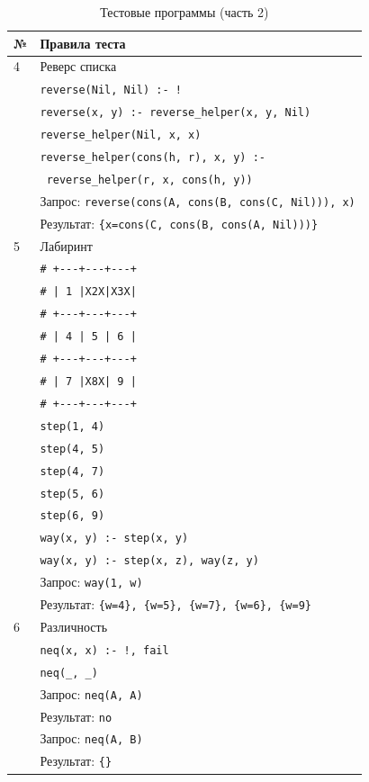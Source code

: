 \begin{table}[ht]
  \caption{Тестовые программы (часть 2)}
  \label{tbl:tests-2}
  \centering
  \begin{tabular}{|l|l|}
    \hline
    \textbf{№} & \textbf{Правила теста} \\
    \hline
    \hline
    4 & Реверс списка \\
    \hline
    & \texttt{reverse(Nil, Nil) :- !} \\
    & \texttt{reverse(x, y) :- reverse\_helper(x, y, Nil)} \\
    & \texttt{reverse\_helper(Nil, x, x)} \\
    & \texttt{reverse\_helper(cons(h, r), x, y) :-} \\
    & \texttt{    reverse\_helper(r, x, cons(h, y))} \\
    \hline
    & Запрос: \texttt{reverse(cons(A, cons(B, cons(C, Nil))), x)} \\
    & Результат: \texttt{\{x=cons(C, cons(B, cons(A, Nil)))\}} \\
    \hline
    \hline
    5 & Лабиринт \\
    \hline
    & \texttt{\# +-\--\--+-\--\--+-\--\--+} \\
    & \texttt{\# | 1 |X2X|X3X|} \\
    & \texttt{\# +-\--\--+-\--\--+-\--\--+} \\
    & \texttt{\# | 4 | 5 | 6 |} \\
    & \texttt{\# +-\--\--+-\--\--+-\--\--+} \\
    & \texttt{\# | 7 |X8X| 9 |} \\
    & \texttt{\# +-\--\--+-\--\--+-\--\--+} \\
    & \texttt{step(1, 4)} \\
    & \texttt{step(4, 5)} \\
    & \texttt{step(4, 7)} \\
    & \texttt{step(5, 6)} \\
    & \texttt{step(6, 9)} \\
    & \texttt{way(x, y) :- step(x, y)} \\
    & \texttt{way(x, y) :- step(x, z), way(z, y)} \\
    \hline
    & Запрос: \texttt{way(1, w)} \\
    & Результат: \texttt{\{w=4\}, \{w=5\}, \{w=7\}, \{w=6\}, \{w=9\}} \\
    \hline
    \hline
    6 & Различность \\
    \hline
    & \texttt{neq(x, x) :- !, fail} \\
    & \texttt{neq(\_, \_)} \\
    \hline
    & Запрос: \texttt{neq(A, A)} \\
    & Результат: \texttt{no} \\
    \hline
    & Запрос: \texttt{neq(A, B)} \\
    & Результат: \texttt{\{\}} \\
    \hline
  \end{tabular}
\end{table}
